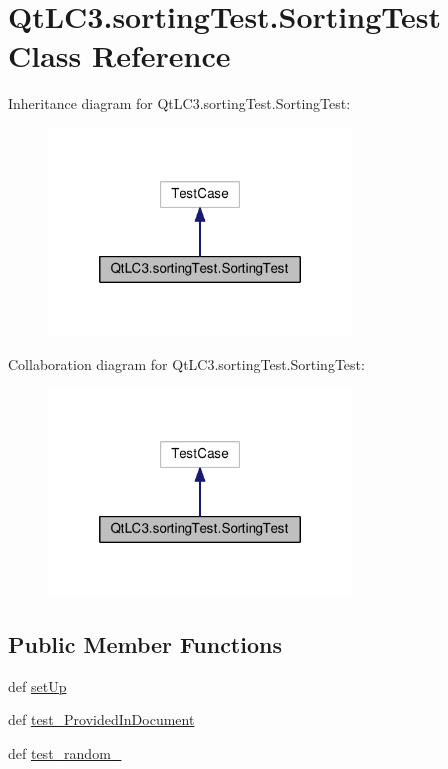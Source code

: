 \hypertarget{class_qt_l_c3_1_1sorting_test_1_1_sorting_test}{\section{Qt\-L\-C3.\-sorting\-Test.\-Sorting\-Test Class Reference}
\label{class_qt_l_c3_1_1sorting_test_1_1_sorting_test}
}


Inheritance diagram for Qt\-L\-C3.\-sorting\-Test.\-Sorting\-Test\-:
\nopagebreak
\begin{figure}[H]
\begin{center}
\leavevmode
\includegraphics[width=228pt]{class_qt_l_c3_1_1sorting_test_1_1_sorting_test__inherit__graph}
\end{center}
\end{figure}


Collaboration diagram for Qt\-L\-C3.\-sorting\-Test.\-Sorting\-Test\-:
\nopagebreak
\begin{figure}[H]
\begin{center}
\leavevmode
\includegraphics[width=228pt]{class_qt_l_c3_1_1sorting_test_1_1_sorting_test__coll__graph}
\end{center}
\end{figure}
\subsection*{Public Member Functions}
\begin{DoxyCompactItemize}
\item 
def \hyperlink{class_qt_l_c3_1_1sorting_test_1_1_sorting_test_ad72a050cb8e3fc0a3d27ae6a614d1fa2}{set\-Up}
\item 
def \hyperlink{class_qt_l_c3_1_1sorting_test_1_1_sorting_test_a8fbda524442059a1390ad64031af6a97}{test\-\_\-\-Provided\-In\-Document}
\item 
def \hyperlink{class_qt_l_c3_1_1sorting_test_1_1_sorting_test_a98bd681eacb66a9ed2f7ca3389c88d0c}{test\-\_\-random\-\_}
\end{DoxyCompactItemize}
